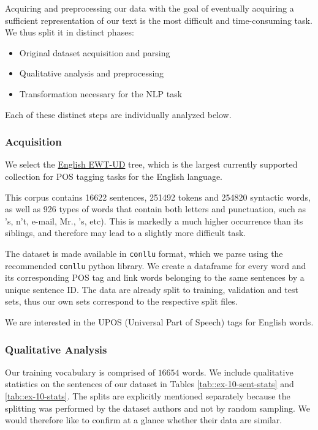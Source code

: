 \documentclass[11pt, a4paper]{article}
\begin{document}
	Acquiring and preprocessing our data with the goal of eventually acquiring a sufficient representation of our text is the most difficult and time-consuming task. We thus split it in distinct phases:
	
	\begin{itemize}
		\item Original dataset acquisition and parsing
		\item Qualitative analysis and preprocessing
		\item Transformation necessary for the NLP task
	\end{itemize}
	
	Each of these distinct steps are individually analyzed below.
	
	
	\subsubsection{Acquisition}
	
	We select the \href{https://universaldependencies.org/treebanks/en_ewt/index.html}{English EWT-UD} tree, which is the largest currently supported collection for POS tagging tasks for the English language.
	
	This corpus contains 16622 sentences, 251492 tokens and 254820 syntactic words, as well as 926 types of words that contain both letters and punctuation, such as 's, n't, e-mail, Mr., ’s, etc). This is markedly a much higher occurrence than its siblings, and therefore may lead to a slightly more difficult task.
	
	The dataset is made available in \texttt{conllu} format, which we parse using the recommended \texttt{conllu} python library. We create a dataframe for every word and its corresponding POS tag and link words belonging to the same sentences by a unique sentence ID. The data are already split to training, validation and test sets, thus our own sets correspond to the respective split files.
	
	We are interested in the UPOS (Universal Part of Speech) tags for English words.
	
	\subsubsection{Qualitative Analysis}
	
	Our training vocabulary is comprised of $16654$ words. We include qualitative statistics on the sentences of our dataset in Tables \ref{tab::ex-10-sent-stats} and \ref{tab::ex-10-stats}. The splits are explicitly mentioned separately because the splitting was performed by the dataset authors and not by random sampling. We would therefore like to confirm at a glance whether their data are similar.
	
\end{document}

